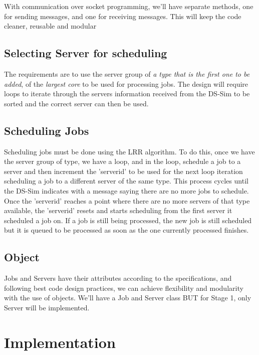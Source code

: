 \documentclass[a4paper]{article} %
\begin{document}
\medskip
With communication over socket programming, we'll have separate methods, one for sending messages, and one for receiving messages. This will keep the code cleaner, \cite{advantagesofoop} reusable and modular

\subsection{Selecting Server for scheduling}
The requirements are to use the server group of \textit{a type that is the first one to be added}, of the \textit{largest core} to be used for processing jobs. The design will require loops to iterate through the servers information received from the DS-Sim to be sorted and the correct server can then be used.

\subsection{Scheduling Jobs}
Scheduling jobs must be done using the LRR algorithm. To do this, once we have the server group of type, we have a loop, and in the loop, schedule a job to a server and then increment the 'serverid' to be used for the next loop iteration scheduling a job to a different server of the same type. This process cycles until the DS-Sim indicates with a message saying there are no more jobs to schedule. Once the 'serverid' reaches a point where there are no more servers of that type available, the 'serverid' resets and starts scheduling from the first server it scheduled a job on. If a job is still being processed, the new job is still scheduled but it is queued to be processed as soon as the one currently processed finishes.

\subsection{Object}
Jobs and Servers have their attributes according to the specifications, and following best code design practices, we can achieve \cite{advantagesofoop} flexibility and modularity with the use of objects. We'll have a Job and Server class BUT for Stage 1, only Server will be implemented.

\break
\section{Implementation}
\end{document}
